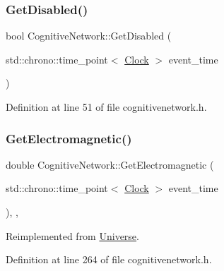 \subsubsection{\texorpdfstring{Get\+Disabled()}{GetDisabled()}}
{\footnotesize\ttfamily bool Cognitive\+Network\+::\+Get\+Disabled (\begin{DoxyParamCaption}\item[{std\+::chrono\+::time\+\_\+point$<$ \mbox{\hyperlink{universe_8h_a0ef8d951d1ca5ab3cfaf7ab4c7a6fd80}{Clock}} $>$}]{event\+\_\+time }\end{DoxyParamCaption})\hspace{0.3cm}{\ttfamily [inline]}}



Definition at line 51 of file cognitivenetwork.\+h.

\mbox{\label{class_cognitive_network_a09e5a1c774c84529a7adfe56fadb7467}} 
\subsubsection{\texorpdfstring{Get\+Electromagnetic()}{GetElectromagnetic()}}
{\footnotesize\ttfamily double Cognitive\+Network\+::\+Get\+Electromagnetic (\begin{DoxyParamCaption}\item[{std\+::chrono\+::time\+\_\+point$<$ \mbox{\hyperlink{universe_8h_a0ef8d951d1ca5ab3cfaf7ab4c7a6fd80}{Clock}} $>$}]{event\+\_\+time }\end{DoxyParamCaption})\hspace{0.3cm}{\ttfamily [inline]}, {\ttfamily [final]}, {\ttfamily [virtual]}}



Reimplemented from \mbox{\hyperlink{class_universe_a63b850ef3f3394313353109d222bf5d1}{Universe}}.



Definition at line 264 of file cognitivenetwork.\+h.

\mbox{\label{class_cognitive_network_a8c4e0454068f714691ae250f795cdb67}} 

